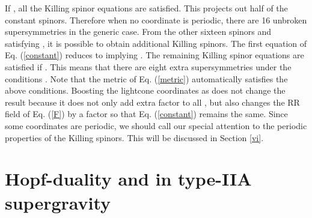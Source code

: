 \documentclass[a4paper,12pt]{article}
\begin{document}
If \coordHE{}, all the Killing spinor equations are satisfied. This projects out half of the constant spinors.  Therefore when no coordinate is periodic, there are 16 unbroken supersymmetries in the generic case. From the other sixteen spinors \coordHE{} and \coordHE{} satisfying \coordHE{}, it is possible to obtain additional Killing spinors. The first equation of Eq. (\ref{constant}) reduces to \coordHE{} implying \coordHE{}. The remaining Killing spinor equations are satisfied if \coordHE{}. This means that there are eight extra supersymmetries under the conditions \coordHE{}. Note that the metric of Eq. (\ref{metric}) automatically satisfies the above conditions. Boosting the lightcone coordinates as \coordHE{} does not change the result because it does not only add extra factor \coordHE{} to all \coordHE{}, but also changes the RR field of Eq. (\ref{F}) by a factor \myHighlight{$\mu$}\coordHE{} so that Eq. (\ref{constant}) remains the same. Since some coordinates are periodic, we should call our special attention to the periodic properties of the Killing spinors. This will be discussed in Section \ref{vi}.

\section{Hopf-duality and \coordHE{} in type-IIA supergravity}\label{iv}
\end{document}
